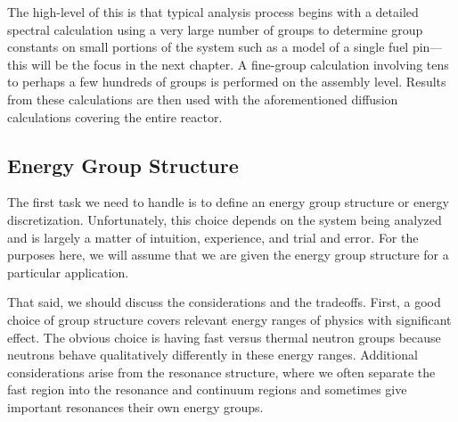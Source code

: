 The high-level of this is that typical analysis process begins with a detailed spectral calculation using a very large number of groups to determine group constants on small portions of the system such as a model of a single fuel pin---this will be the focus in the next chapter. A fine-group calculation involving tens to perhaps a few hundreds of groups is performed on the assembly level. Results from these calculations are then used with the aforementioned diffusion calculations covering the entire reactor.

\subsection{Energy Group Structure}

The first task we need to handle is to define an energy group structure or energy discretization. Unfortunately, this choice depends on the system being analyzed and is largely a matter of intuition, experience, and trial and error. For the purposes here, we will assume that we are given the energy group structure for a particular application. 

That said, we should discuss the considerations and the tradeoffs. First, a good choice of group structure covers relevant energy ranges of physics with significant effect. The obvious choice is having fast versus thermal neutron groups because neutrons behave qualitatively differently in these energy ranges. Additional considerations arise from the resonance structure, where we often separate the fast region into the resonance and continuum regions and sometimes give important resonances their own energy groups.

